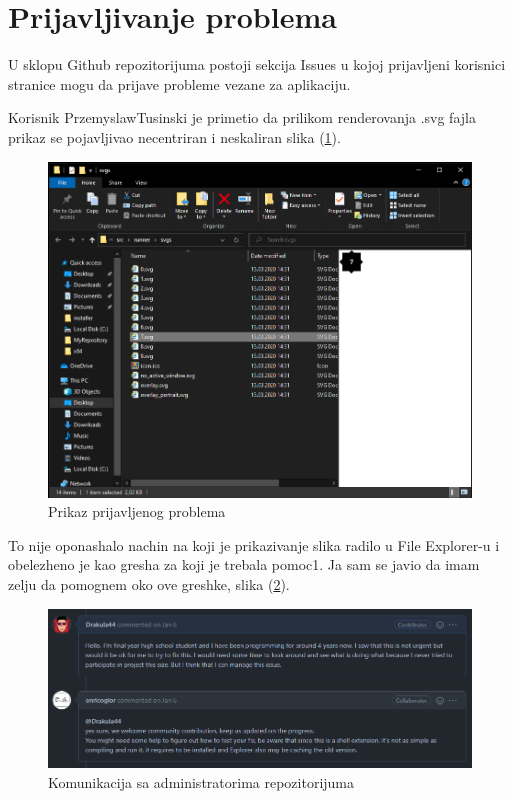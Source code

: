 \documentclass[a4paper,fleqn,12pt]{JMThesis}
\newcommand{\latin}{\fontencoding{T1}\selectfont}
\theoremstyle{plain}
\theoremstyle{definition}
\begin{document}
\section{Prijavljivanje problema}
U sklopu {\latin Github} repozitorijuma postoji sekcija {\latin Issues} u kojoj prijavljeni korisnici stranice mogu da prijave probleme vezane za aplikaciju.
\par Korisnik {\latin PrzemyslawTusinski} je primetio da prilikom renderovanja {\latin .svg} fajla prikaz se pojavljivao necentriran i neskaliran slika (\ref{fig:problem}). 
\begin{figure}[H]
    \centering
    \includegraphics[scale=0.5]{issueproblem.png}
    \caption{Prikaz prijavljenog problema}
    \label{fig:problem}
\end{figure}
To nije oponashalo nachin na koji je prikazivanje slika radilo u {\latin File Explorer}-u i obelezheno je kao gresha za koji je trebala pomoc1. Ja sam se javio da imam zelju da pomognem oko ove greshke, slika (\ref{fig:prijava}).
\begin{figure}[H]
    \centering
    \includegraphics[scale=0.6]{prijava.png}
    \caption{Komunikacija sa administratorima repozitorijuma}
    \label{fig:prijava}
\end{figure}
\end{document}
